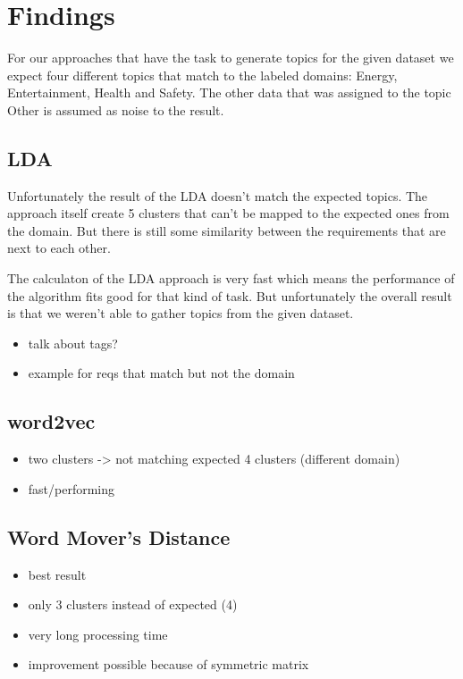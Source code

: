 \section{Findings} %
\label{sec:findings}

For our approaches that have the task to generate topics for the given dataset we expect four different topics that match to the labeled domains: Energy, Entertainment, Health and Safety. The other data that was assigned to the topic Other is assumed as noise to the result.


\subsection{LDA} %
\label{sub:findings_lda}

Unfortunately the result of the LDA doesn't match the expected topics. The approach itself create 5 clusters that can't be mapped to the expected ones from the domain. But there is still some similarity between the requirements that are next to each other.

The calculaton of the LDA approach is very fast which means the performance of the algorithm fits good for that kind of task. But unfortunately the overall result is that we weren't able to gather topics from the given dataset.

\begin{itemize}
\item talk about tags?
\item example for reqs that match but not the domain
\end{itemize}

\subsection{word2vec} %
\label{sub:findings_w2v}

\begin{itemize}
\item two clusters -> not matching expected 4 clusters (different domain)
\item fast/performing
\end{itemize}


\subsection{Word Mover's Distance} %
\label{sub:findings_wmd}

\begin{itemize}
\item best result
\item only 3 clusters instead of expected (4)
\item very long processing time
\item improvement possible because of symmetric matrix
\end{itemize}

